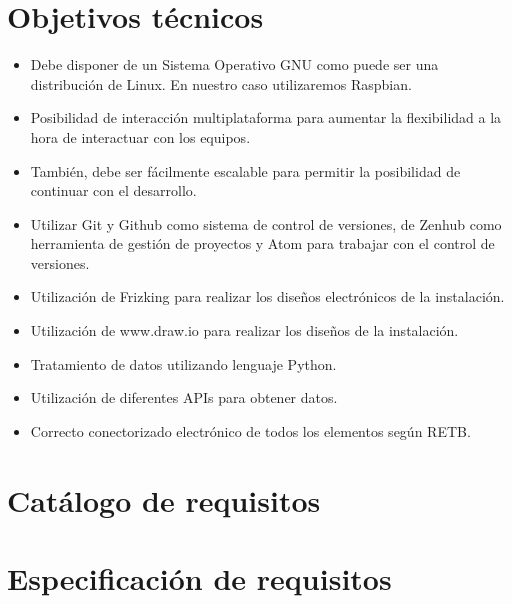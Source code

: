            \section{Objetivos técnicos}
            \begin{itemize}
                
                \item Debe disponer de un Sistema Operativo GNU como puede ser una distribución de Linux. En nuestro caso utilizaremos Raspbian.
                \item Posibilidad de interacción multiplataforma para aumentar la flexibilidad a la hora de interactuar con los equipos.
                \item También, debe ser fácilmente escalable para permitir la posibilidad de continuar con el desarrollo.
                
                \item Utilizar Git y Github como sistema de control de versiones, de Zenhub como herramienta de gestión de proyectos y Atom para trabajar con el control de versiones.
                \item Utilización de Frizking para realizar los diseños electrónicos de la instalación.
                \item Utilización de www.draw.io para realizar los diseños de la instalación.
                \item Tratamiento de datos utilizando lenguaje Python.
                \item Utilización de diferentes APIs para obtener datos.
                \item Correcto conectorizado electrónico de todos los elementos según RETB.
            \end{itemize}





\section{Catálogo de requisitos}

\section{Especificación de requisitos}



